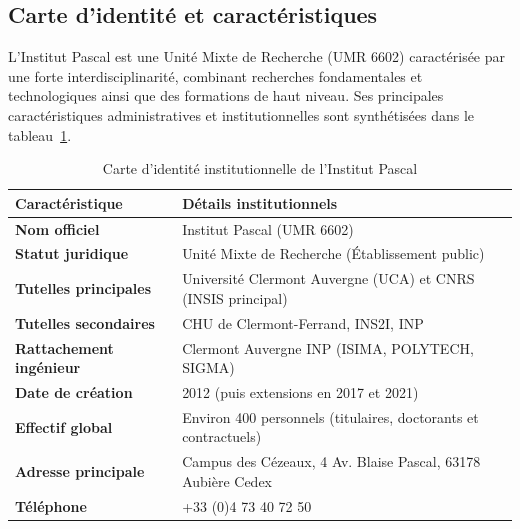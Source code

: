 \documentclass[12pt,a4paper,oneside]{report}
\begin{document}
\vspace{0.5cm}

\subsection{Carte d'identité et caractéristiques}
L'Institut Pascal est une Unité Mixte de Recherche (UMR 6602) caractérisée par une forte interdisciplinarité, combinant recherches fondamentales et technologiques ainsi que des formations de haut niveau. Ses principales caractéristiques administratives et institutionnelles sont synthétisées dans le tableau~\ref{tab:carte_identite}.

\vspace{1cm}

\begin{table}[htbp]
    \centering
    \small
    \renewcommand{\arraystretch}{1.6}
    \begin{tabular}{|l|l|}
        \hline
        \textbf{Caractéristique} & \textbf{Détails institutionnels} \\
        \hline
        \textbf{Nom officiel} & Institut Pascal (UMR 6602) \\
        \hline
        \textbf{Statut juridique} & Unité Mixte de Recherche (Établissement public) \\
        \hline
        \textbf{Tutelles principales} & Université Clermont Auvergne (UCA) et CNRS (INSIS principal) \\
        \hline
        \textbf{Tutelles secondaires} & CHU de Clermont-Ferrand, INS2I, INP \\
        \hline
        \textbf{Rattachement ingénieur} & Clermont Auvergne INP (ISIMA, POLYTECH, SIGMA) \\
        \hline
        \textbf{Date de création} & 2012 (puis extensions en 2017 et 2021) \\
        \hline
        \textbf{Effectif global} & Environ 400 personnels (titulaires, doctorants et contractuels) \\
        \hline
        \textbf{Adresse principale} & Campus des Cézeaux, 4 Av. Blaise Pascal, 63178 Aubière Cedex \\
        \hline
        \textbf{Téléphone} & +33 (0)4 73 40 72 50 \\
        \hline
    \end{tabular}
    \setlength{\abovecaptionskip}{15pt}
    \caption{Carte d'identité institutionnelle de l'Institut Pascal}
    \label{tab:carte_identite}
\end{table}
\end{document}
